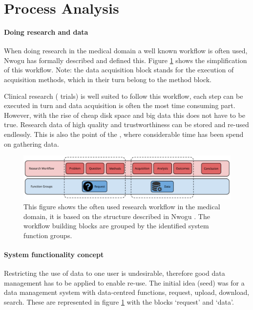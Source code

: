 \section{Process Analysis}

\paragraph{Doing research and \project{} data}
When doing research in the medical domain a well known workflow is often used, Nwogu \cite{nwogu} has formally described and defined this.
Figure \ref{fig:research-workflow} shows the simplification of this workflow.
Note: the data acquisition block stands for the execution of acquisition methods, which in their turn belong to the method block.

Clinical research (\eg{} trials) is well suited to follow this workflow, each step can be executed in turn and data acquisition is often the most time consuming part.
However, with the rise of cheap disk space and big data this does not have to be true.
Research data of high quality and trustworthiness can be stored and re-used endlessly.
This is also the point of the \project{}, where considerable time has been spend on gathering data.

\begin{figure}[hb]
	\centering
	\includegraphics[width=1.0\linewidth]{images/research-workflow}
	\caption{
		This figure shows the often used research workflow in the medical domain, it is based on the structure described in Nwogu \cite{nwogu}.
		The workflow building blocks are grouped by the identified system function groups.
	}
	\label{fig:research-workflow}
\end{figure}

\paragraph{System functionality concept}
Restricting the use of data to one user is undesirable, therefore good data management has to be applied to enable re-use.
The initial idea (seed) was for a data management system with data-centred functions, \eg{} request, upload, download, search.
These are represented in figure \ref{fig:research-workflow} with the blocks `request' and `data'.

